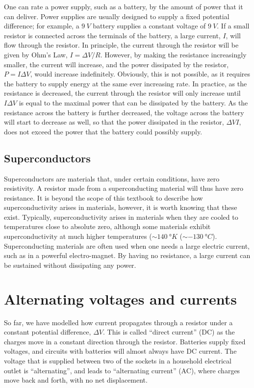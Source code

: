 One can rate a power supply, such as a battery, by the amount of power that it can deliver. Power supplies are usually designed to supply a fixed potential difference; for example, a $\SI{9}{V}$ battery supplies a constant voltage of $\SI{9}{V}$. If a small resistor is connected across the terminals of the battery, a large current, $I$, will flow through the resistor. In principle, the current through the resistor will be given by Ohm's Law, $I=\Delta V/R$. However, by making the resistance increasingly smaller, the current will increase, and the power dissipated by the resistor, $P=I\Delta V $, would increase indefinitely. Obviously, this is not possible, as it requires the battery to supply energy at the same ever increasing rate. In practice, as the resistance is decreased, the current through the resistor will only increase until $I \Delta V$ is equal to the maximal power that can be dissipated by the battery. As the resistance across the battery is further decreased, the voltage across the battery will start to decrease as well, so that the power dissipated in the resistor, $\Delta V I$, does not exceed the power that the battery could possibly supply.

\subsection{Superconductors}
Superconductors are materials that, under certain conditions, have zero resistivity. A resistor made from a superconducting material will thus have zero resistance. It is beyond the scope of this textbook to describe how superconductivity arises in materials, however, it is worth knowing that these exist. Typically, superconductivity arises in materials when they are cooled to temperatures close to absolute zero, although some materials exhibit superconductivity at much higher temperatures ($\sim\SI{140}{\degree K}$ ($\sim\SI{-130}{\degree C}$). Superconducting materials are often used when one needs a large electric current, such as in a powerful electro-magnet. By having no resistance, a large current can be sustained without dissipating any power. 

                                                         
\section{Alternating voltages and currents}
So far, we have modelled how current propagates through a resistor under a constant potential difference, $\Delta V$. This is called ``direct current'' (DC) as the charges move in a constant direction through the resistor. Batteries supply fixed voltages, and circuits with batteries will almost always have DC current. The voltage that is supplied between two of the sockets in a household electrical outlet is ``alternating'', and leads to ``alternating current'' (AC), where charges move back and forth, with no net displacement. 


